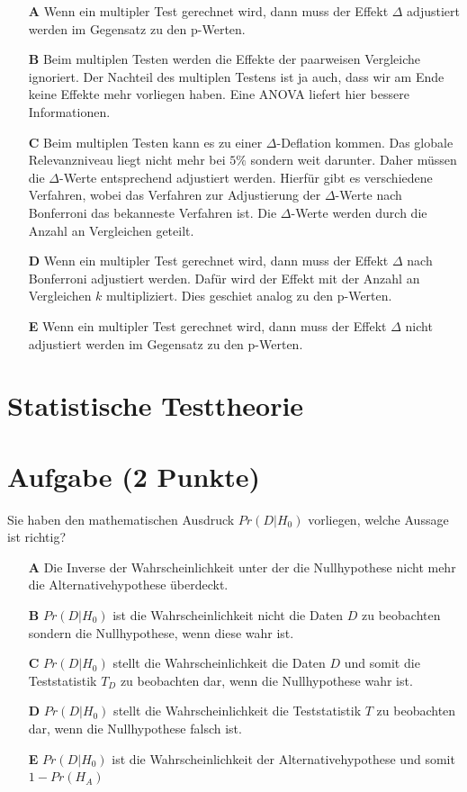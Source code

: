 \documentclass[a4paper, 9pt]{scrartcl}\usepackage[]{graphicx}\usepackage[]{xcolor}
\begin{document}
\begin{enumerate}
\item [\textbf{A} \msquare] Wenn ein multipler Test gerechnet wird, dann muss der Effekt $\Delta$ adjustiert werden im Gegensatz zu den p-Werten.
\item [\textbf{B} \msquare] Beim multiplen Testen werden die Effekte der paarweisen Vergleiche ignoriert. Der Nachteil des multiplen Testens ist ja auch, dass wir am Ende keine Effekte mehr vorliegen haben. Eine ANOVA liefert hier bessere Informationen.
\item [\textbf{C} \msquare] Beim multiplen Testen kann es zu einer $\Delta$-Deflation kommen. Das globale Relevanzniveau liegt nicht mehr bei $5\%$ sondern weit darunter. Daher müssen die $\Delta$-Werte entsprechend adjustiert werden. Hierfür gibt es verschiedene Verfahren, wobei das Verfahren zur Adjustierung der $\Delta$-Werte nach Bonferroni das bekanneste Verfahren ist. Die $\Delta$-Werte werden durch die Anzahl an Vergleichen geteilt.
\item [\textbf{D} \msquare] Wenn ein multipler Test gerechnet wird, dann muss der Effekt $\Delta$ nach Bonferroni adjustiert werden. Dafür wird der Effekt mit der Anzahl an Vergleichen $k$ multipliziert. Dies geschiet analog zu den p-Werten.
\item [\textbf{E} \msquare] Wenn ein multipler Test gerechnet wird, dann muss der Effekt $\Delta$ nicht adjustiert werden im Gegensatz zu den p-Werten.
\end{enumerate}
\section*{Statistische Testtheorie}  

\section{Aufgabe \hfill (2 Punkte)}




Sie haben den mathematischen Ausdruck $Pr(D|H_0)$ vorliegen, welche Aussage ist richtig?



\begin{enumerate}
\item [\textbf{A} \msquare] Die Inverse der Wahrscheinlichkeit unter der die Nullhypothese nicht mehr die Alternativehypothese überdeckt.
\item [\textbf{B} \msquare] $Pr(D|H_0)$ ist die Wahrscheinlichkeit nicht die Daten $D$ zu beobachten sondern die Nullhypothese, wenn diese wahr ist.
\item [\textbf{C} \msquare] $Pr(D|H_0)$ stellt die Wahrscheinlichkeit die Daten $D$ und somit die Teststatistik $T_D$ zu beobachten dar, wenn die Nullhypothese wahr ist.
\item [\textbf{D} \msquare] $Pr(D|H_0)$ stellt die Wahrscheinlichkeit die Teststatistik $T$ zu beobachten dar, wenn die Nullhypothese falsch ist.
\item [\textbf{E} \msquare] $Pr(D|H_0)$ ist die Wahrscheinlichkeit der Alternativehypothese und somit $1 - Pr(H_A)$
\end{enumerate}
\end{document}
